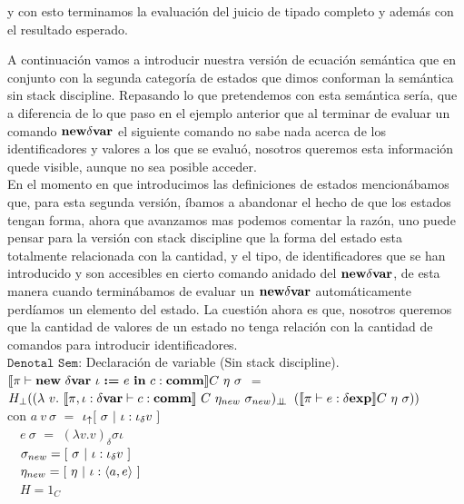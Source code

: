 y con esto terminamos la evaluaci\'on del juicio de tipado completo y adem\'as con 
el resultado esperado.

A continuaci\'on vamos a introducir nuestra versi\'on de ecuaci\'on sem\'antica
que en conjunto con la segunda categor\'ia de estados que dimos conforman la sem\'antica
sin stack discipline. Repasando lo que pretendemos con esta sem\'antica ser\'ia, 
que a diferencia de lo que paso en el ejemplo anterior que al terminar de evaluar
un comando $\textbf{new} \delta \textbf{var}$ el siguiente comando no sabe nada acerca de los
identificadores y valores a los que se evalu\'o, nosotros queremos esta informaci\'on
quede visible, aunque no sea posible acceder.\\

En el momento en que introducimos las definiciones de estados mencion\'abamos 
que, para esta segunda versi\'on, \'ibamos a abandonar el hecho de que los estados tengan
forma, ahora que avanzamos mas podemos comentar la raz\'on, uno puede pensar para la
versi\'on con stack discipline que la forma del estado esta totalmente relacionada
con la cantidad, y el tipo, de identificadores que se han introducido y son accesibles
en cierto comando anidado del $\textbf{new} \delta \textbf{var}$, de esta manera cuando termin\'abamos 
de evaluar un $\textbf{new} \delta \textbf{var}$ autom\'aticamente perd\'iamos un elemento del estado.
La cuesti\'on ahora es que, nosotros queremos que la cantidad de valores de un
estado no tenga relaci\'on con la cantidad de comandos para introducir identificadores.\\

\noindent
$\texttt{Denotal Sem:}$ Declaraci\'on de variable (Sin stack discipline).\\

$\llbracket \pi \vdash \textbf{new} \ \delta \textbf{var} \ \iota \ \textbf{:=} \ e \ \textbf{in} \ c : \textbf{comm} \rrbracket C \ \eta \ \sigma$ 
$=$ \\ \indent \indent
$H_{\bot} ((\lambda \ v . \ \semBrcks{\pi,\iota:\deltavar \vdash c : \commt}
		\ C \ \eta_{new} \ \sigma_{new})_{\dbot}$
$(\semBrcks{\pi \vdash e : \deltaexp}C \ \eta \ \sigma))$\\

con 
$a \ v \ \sigma$ $=$ $\iota_{\uparrow} [ \ \sigma \ | \ \iota:\iota_{\delta} v \ ] $\\
\indent \indent \ \
$e \ \sigma$ $=$ $(\lambda v . v)_{\delta}\sigma \iota$\\
\indent \indent \ \
$\sigma_{new} = [ \ \sigma \ | \ \iota:\iotadelta v \ ]$\\
\indent \indent \ \
$\eta_{new} = [ \ \eta \ | \ \iota:\lrangles{a,e} \ ]$\\
\indent \indent \ \
$H = 1_C$\\

